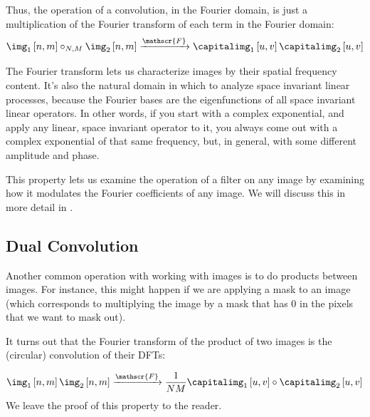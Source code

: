 Thus, the operation of a convolution, in the Fourier domain, is just a multiplication of the Fourier transform of each term in the
Fourier domain: 
\begin{equation}
\img_1 \left[n,m\right] \circ_{N,M} \img_2 \left[n,m\right]
\xrightarrow{\mathscr{F}} 
\capitalimg_1 \left[u,v\right] \capitalimg_2 \left[u,v\right]
\end{equation}

The Fourier transform lets us characterize images by their spatial
frequency content.  It's also the natural domain in which to analyze
space invariant linear processes, because the Fourier bases are the
eigenfunctions of all space invariant linear operators.  In other
words, if you start with a complex exponential, and apply any linear,
space invariant operator to it, you always come out with a complex
exponential of that same frequency, but, in general, with some
different amplitude and phase. 

This property lets us examine the operation of a filter on any image
by examining how it modulates the Fourier coefficients of any image.  We will discuss this in more detail in \sect{\ref{sect:transfer_function}}. 


\subsection{Dual Convolution}
\label{section:dualconv}

Another common operation with working with images is to do products between images. For instance, this might happen if we are applying a mask to an image (which corresponds to multiplying the image by a mask that has 0 in the pixels that we want to mask out). 

It turns out that the Fourier transform of the product of two images
is the (circular) convolution of their DFTs:

\begin{equation}
\img_1 \left[n,m\right] \img_2 \left[n,m\right]
\xrightarrow{\mathscr{F}} 
\frac{1}{NM} \capitalimg_1 \left[u,v\right] \circ \capitalimg_2 \left[u,v\right]
\end{equation}
We leave the proof of this property to the reader.


